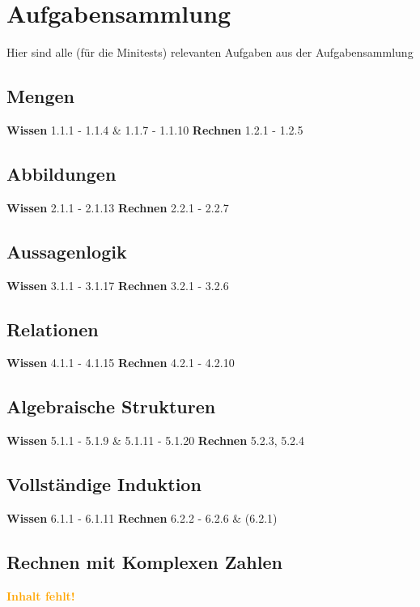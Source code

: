 \documentclass[11pt]{article}
\begin{document}
    \section{Aufgabensammlung}
    Hier sind alle (für die Minitests) relevanten Aufgaben aus der Aufgabensammlung\newline
    \subsection{Mengen}
    \textbf{Wissen}
    1.1.1 - 1.1.4 \& 1.1.7 - 1.1.10\newline
    \textbf{Rechnen}
    1.2.1 - 1.2.5

    \subsection{Abbildungen}
    \textbf{Wissen}
    2.1.1 - 2.1.13\newline
    \textbf{Rechnen}
    2.2.1 - 2.2.7
    
    \subsection{Aussagenlogik}
    \textbf{Wissen}
    3.1.1 - 3.1.17\newline
    \textbf{Rechnen}
    3.2.1 - 3.2.6

    \subsection{Relationen}
    \textbf{Wissen}
    4.1.1 - 4.1.15\newline
    \textbf{Rechnen}
    4.2.1 - 4.2.10

    \subsection{Algebraische Strukturen}
    \textbf{Wissen}
    5.1.1 - 5.1.9 \& 5.1.11 - 5.1.20\newline
    \textbf{Rechnen}
    5.2.3, 5.2.4

    \subsection{Vollständige Induktion}
    \textbf{Wissen}
    6.1.1 - 6.1.11\newline
    \textbf{Rechnen}
    6.2.2 - 6.2.6 \& (6.2.1)

    \subsection{Rechnen mit Komplexen Zahlen}
    \textcolor{orange}{\textbf{Inhalt fehlt!}}
\end{document}
